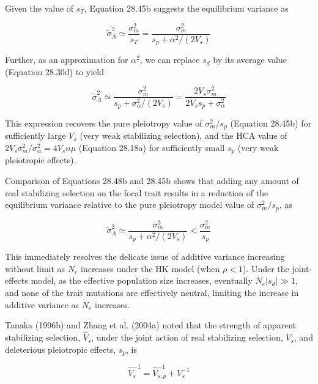 \documentclass{article}
\begin{document}
Given the value of  $ s_{T} $, Equation 28.45b suggests the equilibrium variance as

\begin{equation}
\widetilde{\sigma}_{A}^{2}\simeq\frac{\sigma_{m}^{2}}{s_{T}}=\frac{\sigma_{m}^{2}}{s_{p}+\alpha^{2}/\left(2V_{s}\right)}
\tag{28.48b}
\label{eq:28_48b}
\end{equation}

Further, as an approximation for  $ \alpha^{2} $, we can replace  $ s_{d} $ by its average value (Equation 28.30d) to yield

\begin{equation}
\widetilde{\sigma}_{A}^{2}\simeq\frac{\sigma_{m}^{2}}{s_{p}+\sigma_{\alpha}^{2}/(2V_{s})}=\frac{2V_{s}\sigma_{m}^{2}}{2V_{s}s_{p}+\sigma_{\alpha}^{2}}
\tag{28.48c}
\label{eq:28_48c}
\end{equation}

This expression recovers the pure pleiotropy value of  $ \sigma_m^2/s_p $ (Equation 28.45b) for sufficiently large  $ V_s $ (very weak stabilizing selection), and the HCA value of  $ 2V_s\sigma_m^2/\sigma_\alpha^2 = 4V_s n\mu $ (Equation 28.18a) for sufficiently small  $ s_p $ (very weak pleiotropic effects).

Comparison of Equations 28.48b and 28.45b shows that adding any amount of real stabilizing selection on the focal trait results in a reduction of the equilibrium variance relative to the pure pleiotropy model value of  $ \sigma_{m}^2/s_p $, as

\begin{equation}
\widetilde{\sigma}_{A}^{2}\simeq\frac{\sigma_{m}^{2}}{s_{p}+\alpha^{2}/(2V_{s})}<\frac{\sigma_{m}^{2}}{s_{p}}
\tag{28.48d}
\label{eq:28_48d}
\end{equation}

This immediately resolves the delicate issue of additive variance increasing without limit as  $ N_e $ increases under the HK model (when  $ \rho < 1 $). Under the joint-effects model, as the effective population size increases, eventually  $ N_e | s_d| \gg 1 $, and none of the trait mutations are effectively neutral, limiting the increase in additive variance as  $ N_e $ increases.

Tanaka (1996b) and Zhang et al. (2004a) noted that the strength of apparent stabilizing selection,  $ \widehat{V}_{s} $, under the joint action of real stabilizing selection,  $ V_{s} $, and deleterious pleiotropic effects,  $ s_{p} $, is

\begin{equation}
\widehat{V}_{s}^{-1}=\widehat{V}_{s,p}^{-1}+V_{s}^{-1}
\tag{28.49}
\label{eq:28_49}
\end{equation}
\end{document}
